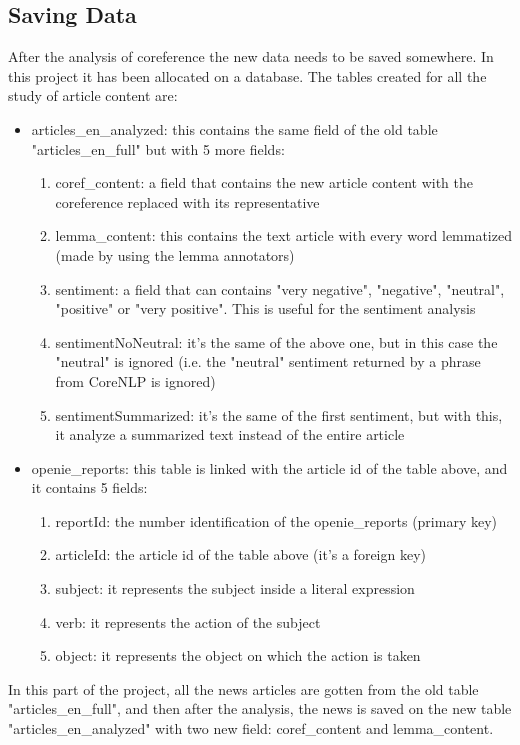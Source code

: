 \subsection{Saving Data}
After the analysis of coreference the new data needs to be saved somewhere. In this project it has been allocated on a database. The tables created for all the study of article content are:
\begin{itemize}
	\item articles_en_analyzed: this contains the same field of the old table "articles_en_full" but with 5 more fields:
	\begin{enumerate}
		\item coref_content: a field that contains the new article content with the coreference replaced with its representative
		\item lemma_content: this contains the text article with every word lemmatized (made by using the lemma annotators)
		\item sentiment: a field that can contains "very negative", "negative", "neutral", "positive" or "very positive". This is useful for the sentiment analysis
		\item sentimentNoNeutral: it's the same of the above one, but in this case the "neutral" is ignored (i.e. the "neutral" sentiment returned by a phrase from CoreNLP is ignored)
		\item sentimentSummarized: it's the same of the first sentiment, but with this, it analyze a summarized text instead of the entire article
	\end{enumerate}
	\item openie_reports: this table is linked with the article id of the table above, and it contains 5 fields:
	\begin{enumerate}
		\item reportId: the number identification of the openie_reports (primary key)
		\item articleId: the article id of the table above (it's a foreign key)
		\item subject: it represents the subject inside a literal expression
		\item verb: it represents the action of the subject
		\item object: it represents the object on which the action is taken
	\end{enumerate}
\end{itemize}
In this part of the project, all the news articles are gotten from the old table "articles_en_full", and then after the analysis, the news is saved on the new table "articles_en_analyzed" with two new field: coref_content and lemma_content.

